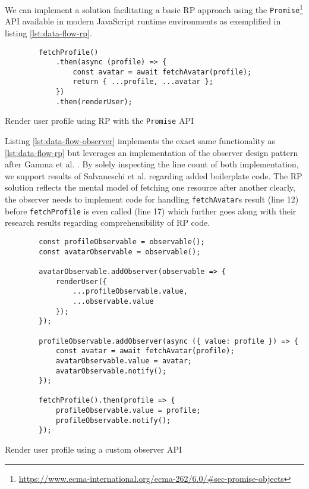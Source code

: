 \documentclass[12pt,a4paper]{article}
\begin{document}
We can implement a solution facilitating a basic RP approach using the \texttt{Promise}\footnote{\url{https://www.ecma-international.org/ecma-262/6.0/\#sec-promise-objects}} API available in modern JavaScript runtime environments as exemplified in listing \ref{lst:data-flow-rp}.

\begin{listing}
	\begin{verbatim}
		fetchProfile()
			.then(async (profile) => {
				const avatar = await fetchAvatar(profile);
				return { ...profile, ...avatar };
			})
			.then(renderUser);
	\end{verbatim}
	\caption{Render user profile using RP with the \texttt{Promise} API}
	\label{lst:data-flow-rp}
\end{listing}

Listing \ref{lst:data-flow-observer} implements the exact same functionality as \ref{lst:data-flow-rp} but leverages an implementation of the observer design pattern after Gamma et al. \cite{gamma1995design}. By solely inspecting the line count of both implementation, we support results of Salvaneschi et al. \cite{7827078} regarding added boilerplate code. The RP solution reflects the mental model of fetching one resource after another clearly, the observer needs to implement code for handling \texttt{fetchAvatar}s result (line 12) before \texttt{fetchProfile} is even called (line 17) which further goes along with their research results regarding comprehensibility of RP code.

\begin{listing}[H]
	\begin{verbatim}
		const profileObservable = observable();
		const avatarObservable = observable();

		avatarObservable.addObserver(observable => {
			renderUser({
				...profileObservable.value,
				...observable.value
			});
		});

		profileObservable.addObserver(async ({ value: profile }) => {
			const avatar = await fetchAvatar(profile);
			avatarObservable.value = avatar;
			avatarObservable.notify();
		});

		fetchProfile().then(profile => {
			profileObservable.value = profile;
			profileObservable.notify();
		});
	\end{verbatim}
	\caption{Render user profile using a custom observer API}
	\label{lst:data-flow-observer}
\end{listing}
\end{document}
